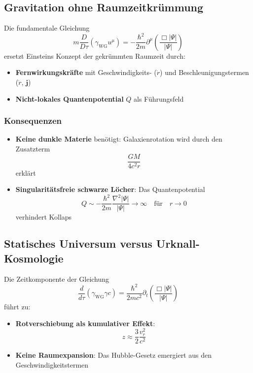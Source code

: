 \subsection{Gravitation ohne Raumzeitkrümmung}
Die fundamentale Gleichung
\begin{equation}
m \frac{D}{D\tau}(\gamma_{\mathrm{WG}} u^\mu) = -\frac{\hbar^2}{2m}\partial^\mu\left(\frac{\Box|\Psi|}{|\Psi|}\right)
\end{equation}
ersetzt Einsteins Konzept der gekrümmten Raumzeit durch:

\begin{itemize}
\item \textbf{Fernwirkungskräfte} mit Geschwindigkeits- ($\dot{r}$) und Beschleunigungstermen ($\ddot{r}$, $\mathbf{j}$)
\item \textbf{Nicht-lokales Quantenpotential} $Q$ als Führungsfeld
\end{itemize}

\subsubsection{Konsequenzen}
\begin{itemize}
\item \textbf{Keine dunkle Materie} benötigt: Galaxienrotation wird durch den Zusatzterm
\begin{equation}
\frac{GM}{4c^2r}
\end{equation}
erklärt

\item \textbf{Singularitätsfreie schwarze Löcher}: Das Quantenpotential
\begin{equation}
Q \sim -\frac{\hbar^2}{2m}\frac{\nabla^2|\Psi|}{|\Psi|} \to \infty \quad \text{für} \quad r \to 0
\end{equation}
verhindert Kollaps
\end{itemize}

\subsection{Statisches Universum versus Urknall-Kosmologie}
Die Zeitkomponente der Gleichung
\begin{equation}
\frac{d}{d\tau}(\gamma_{\mathrm{WG}}\gamma c) = \frac{\hbar^2}{2mc^2}\partial_t\left(\frac{\Box|\Psi|}{|\Psi|}\right)
\end{equation}
führt zu:

\begin{itemize}
\item \textbf{Rotverschiebung als kumulativer Effekt}:
\begin{equation}
z \approx \frac{3}{2}\frac{v_r^2}{c^2}
\end{equation}

\item \textbf{Keine Raumexpansion}: Das Hubble-Gesetz emergiert aus den Geschwindigkeitstermen
\end{itemize}


